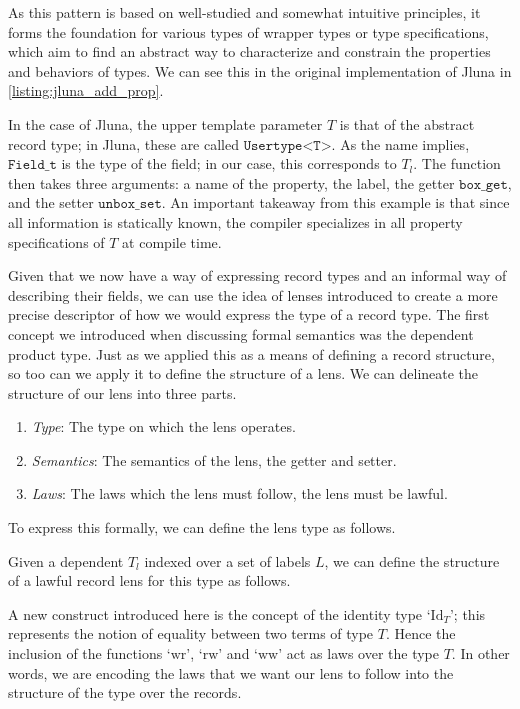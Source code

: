 As this pattern is based on well-studied and somewhat intuitive principles, it forms the foundation for various types of wrapper types or type specifications, which aim to find an abstract way to characterize and constrain the properties and behaviors of types. We can see this in the original implementation of Jluna in \ref{listing:jluna_add_prop}.

\begin{listing}[ht!]
  
  \caption{Jluna add property function}
  \label{listing:jluna_add_prop}
\end{listing}

In the case of Jluna, the upper template parameter $T$ is that of the abstract record type; in Jluna, these are called $\texttt{Usertype<T>}$. As the name implies, $\texttt{Field\_t}$ is the type of the field; in our case, this corresponds to $T_l$. The function then takes three arguments: a name of the property, \ie the label, the getter $\texttt{box\_get}$, and the setter $\texttt{unbox\_set}$. An important takeaway from this example is that since all information is statically known, the compiler specializes in all property specifications of $T$ at compile time.

Given that we now have a way of expressing record types and an informal way of describing their fields, we can use the idea of lenses introduced to create a more precise descriptor of how we would express the type of a record type. The first concept we introduced when discussing formal semantics was the dependent product type. Just as we applied this as a means of defining a record structure, so too can we apply it to define the structure of a lens. We can delineate the structure of our lens into three parts.

\begin{enumerate}
  \item \textit{Type}: The type on which the lens operates.
  \item \textit{Semantics}: The semantics of the lens, \ie the getter and setter.
  \item \textit{Laws}: The laws which the lens must follow, \ie the lens must be lawful.
\end{enumerate}

To express this formally, we can define the lens type as follows.
\begin{definition}
 Given a dependent $T_l$ indexed over a set of labels $L$, we can define the structure of a lawful record lens for this type as follows. 
  
  
  
 A new construct introduced here is the concept of the identity type `$\text{Id}_T$'; this represents the notion of equality between two terms of type $T$. Hence the inclusion of the functions `$\text{wr}$', `$\text{rw}$' and `$\text{ww}$' act as laws over the type $T$. In other words, we are encoding the laws that we want our lens to follow into the structure of the type over the records. \cite{nlab:structure}
\end{definition}

